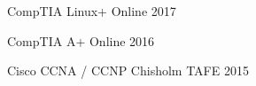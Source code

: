 

\begin{cvhonors}

  \cvhonor
    {CompTIA Linux+} %
    {Online} %
    {} %
    {2017} %

 
  \cvhonor
    {CompTIA A+} %
    {Online} %
    {} %
    {2016} %

  \cvhonor
    {Cisco CCNA / CCNP} %
    {Chisholm TAFE} %
    {} %
    {2015} %

\end{cvhonors}
